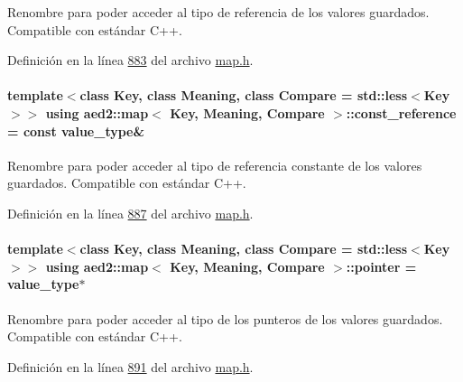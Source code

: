 Renombre para poder acceder al tipo de referencia de los valores guardados. Compatible con estándar C++. 



Definición en la línea \hyperlink{map_8h_source_l00883}{883} del archivo \hyperlink{map_8h_source}{map.\+h}.

\paragraph[{\texorpdfstring{const\+\_\+reference}{const_reference}}]{\setlength{\rightskip}{0pt plus 5cm}template$<$class Key, class Meaning, class Compare = std\+::less$<$\+Key$>$$>$ using {\bf aed2\+::map}$<$ Key, Meaning, Compare $>$\+::{\bf const\+\_\+reference} =  const {\bf value\+\_\+type}\&}\hypertarget{classaed2_1_1map_a277080d3db76f19df9319ecba16475a9_a277080d3db76f19df9319ecba16475a9}{}\label{classaed2_1_1map_a277080d3db76f19df9319ecba16475a9_a277080d3db76f19df9319ecba16475a9}


Renombre para poder acceder al tipo de referencia constante de los valores guardados. Compatible con estándar C++. 



Definición en la línea \hyperlink{map_8h_source_l00887}{887} del archivo \hyperlink{map_8h_source}{map.\+h}.

\paragraph[{\texorpdfstring{pointer}{pointer}}]{\setlength{\rightskip}{0pt plus 5cm}template$<$class Key, class Meaning, class Compare = std\+::less$<$\+Key$>$$>$ using {\bf aed2\+::map}$<$ Key, Meaning, Compare $>$\+::{\bf pointer} =  {\bf value\+\_\+type}$\ast$}\hypertarget{classaed2_1_1map_a7394e98a23b86bc008ad73326b273fd5_a7394e98a23b86bc008ad73326b273fd5}{}\label{classaed2_1_1map_a7394e98a23b86bc008ad73326b273fd5_a7394e98a23b86bc008ad73326b273fd5}


Renombre para poder acceder al tipo de los punteros de los valores guardados. Compatible con estándar C++. 



Definición en la línea \hyperlink{map_8h_source_l00891}{891} del archivo \hyperlink{map_8h_source}{map.\+h}.

